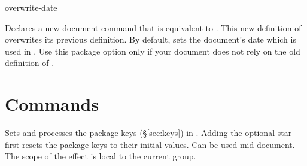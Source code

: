 \documentclass{beery}
\begin{document}
\begin{variable}{overwrite-date}
  \begin{syntax}
  \end{syntax}
  Declares a new document command  that is equivalent to .
  This new definition of  overwrites its previous definition.
  By default,  sets the document\rq s date which is used in .
  Use this package option only if your document does not rely on the old definition of .
\end{variable}


\section{Commands}
\label{sec:commands}


\begin{function}{\clockdatesetup}
  \begin{syntax}
     \sarg{} 
  \end{syntax}
  Sets and processes the  package keys (\S\ref{sec:keys}) in .
  Adding the optional star first resets the  package keys to their initial values.
  Can be used mid-document.
  The scope of the effect is local to the current group.
\end{function}
\end{document}
